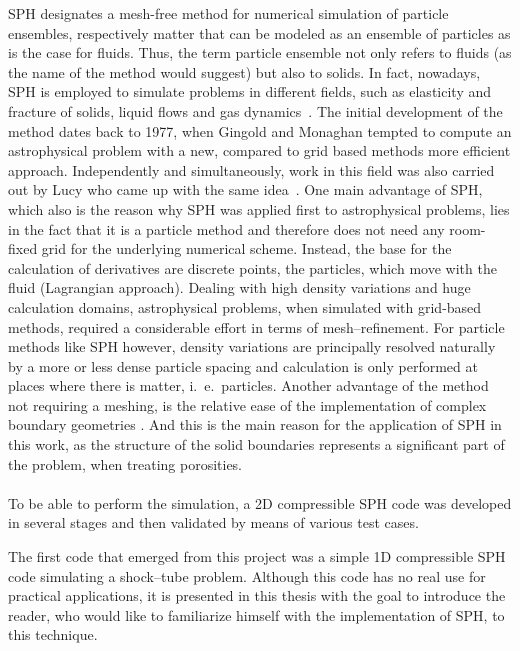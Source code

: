 \documentclass[11pt,a4paper,twoside]{report}
\begin{document}
SPH designates a mesh-free method for numerical simulation of particle
ensembles, respectively matter that can be modeled as an ensemble of
particles as is the case for fluids.
Thus, the term particle ensemble not only refers
to fluids (as the name of the method would suggest) but also to solids. In
fact, nowadays, SPH is employed to simulate problems in different fields,
such as elasticity and fracture of solids, liquid flows and gas
dynamics~\cite{Monaghan2005}.
The initial development of the method dates back to 1977, when Gingold and
Monaghan \cite{Gingold1977} tempted to compute an astrophysical %
problem with a new, compared to grid based methods more efficient approach. Independently and simultaneously, work in this field was also carried out by Lucy who came up with the same idea~\cite{Lucy1977}. One main advantage of SPH, which also is the reason why SPH was applied first to astrophysical problems, lies in the fact that it is a particle method and therefore does not need any room-fixed grid for the underlying numerical scheme. Instead, the base for the calculation of derivatives are discrete points, the particles, which move with the fluid (Lagrangian approach). Dealing with high density variations and huge calculation domains, astrophysical problems, when simulated with grid-based methods, 
required a considerable effort in terms of mesh--refinement. For particle methods like SPH however, density variations are principally resolved naturally by a more or less dense particle spacing and calculation is only performed at places where there is matter, i.\ e.\ particles.
Another advantage of the method not requiring a meshing, is the relative ease of the implementation of complex boundary geometries \cite{Adams2010}. And this is the main reason for the application of SPH in this work, as the structure of the solid boundaries represents a significant part of the problem, when treating porosities.\\
\\
\indent
To be able to perform the simulation, a 2D compressible SPH code was developed in several stages and then validated by means of various test cases.

The first code that emerged from this project was a simple 1D compressible SPH code simulating a shock--tube problem. Although this code has no real use for practical applications, it is presented in this thesis with the goal to introduce the reader, who would like to familiarize himself with the implementation of SPH, to this technique.
\end{document}
